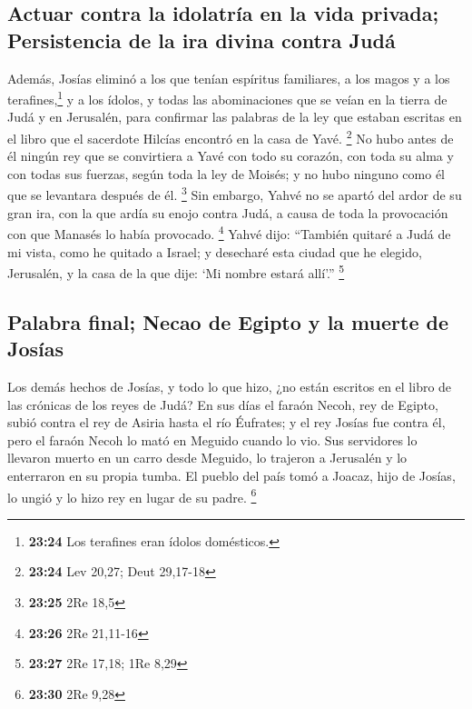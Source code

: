 \begin{paracol}{2}
\hypertarget{actuar-contra-la-idolatruxeda-en-la-vida-privada-persistencia-de-la-ira-divina-contra-juduxe1}{%
\subsection{Actuar contra la idolatría en la vida privada; Persistencia
de la ira divina contra
Judá}\label{actuar-contra-la-idolatruxeda-en-la-vida-privada-persistencia-de-la-ira-divina-contra-juduxe1}}

 Además, Josías eliminó a los que tenían espíritus
familiares, a los magos y a los terafines,\footnote{\textbf{23:24} Los
  terafines eran ídolos domésticos.} y a los ídolos, y todas las
abominaciones que se veían en la tierra de Judá y en Jerusalén, para
confirmar las palabras de la ley que estaban escritas en el libro que el
sacerdote Hilcías encontró en la casa de Yavé. \footnote{\textbf{23:24}
  Lev 20,27; Deut 29,17-18}  No hubo antes de él ningún
rey que se convirtiera a Yavé con todo su corazón, con toda su alma y
con todas sus fuerzas, según toda la ley de Moisés; y no hubo ninguno
como él que se levantara después de él. \footnote{\textbf{23:25} 2Re
  18,5}  Sin embargo, Yahvé no se apartó del ardor de su
gran ira, con la que ardía su enojo contra Judá, a causa de toda la
provocación con que Manasés lo había provocado. \footnote{\textbf{23:26}
  2Re 21,11-16}  Yahvé dijo: ``También quitaré a Judá de
mi vista, como he quitado a Israel; y desecharé esta ciudad que he
elegido, Jerusalén, y la casa de la que dije: `Mi nombre estará allí'.''
\footnote{\textbf{23:27} 2Re 17,18; 1Re 8,29}

\hypertarget{palabra-final-necao-de-egipto-y-la-muerte-de-josuxedas}{%
\subsection{Palabra final; Necao de Egipto y la muerte de
Josías}\label{palabra-final-necao-de-egipto-y-la-muerte-de-josuxedas}}

 Los demás hechos de Josías, y todo lo que hizo, ¿no
están escritos en el libro de las crónicas de los reyes de Judá?
 En sus días el faraón Necoh, rey de Egipto, subió contra
el rey de Asiria hasta el río Éufrates; y el rey Josías fue contra él,
pero el faraón Necoh lo mató en Meguido cuando lo vio. 
Sus servidores lo llevaron muerto en un carro desde Meguido, lo trajeron
a Jerusalén y lo enterraron en su propia tumba. El pueblo del país tomó
a Joacaz, hijo de Josías, lo ungió y lo hizo rey en lugar de su padre.
\footnote{\textbf{23:30} 2Re 9,28}


\end{paracol}
